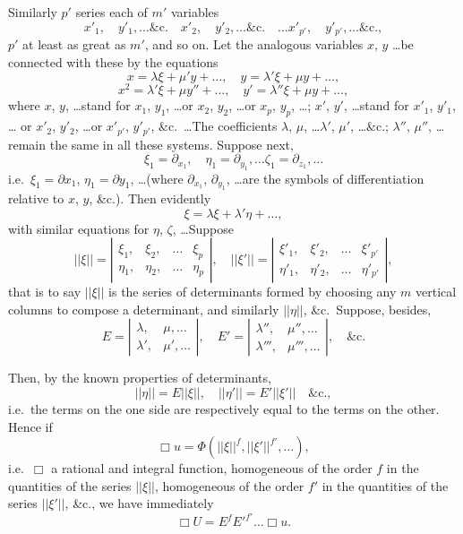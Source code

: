 \documentclass[11pt,a4paper]{article}
\theoremstyle{plain}
\theoremstyle{definition}
\theoremstyle{remark}
\begin{document}
Similarly $p'$ series each of $m'$ variables
\[
x'_1, \quad y'_1, \ldots \&\text{c.} \quad x'_2, \quad y'_2, \ldots \&\text{c.} \quad \ldots x'_{p'}, \quad y'_{p'}, \ldots \&\text{c.},
\]
$p'$ at least as great as $m'$, and so on. Let the analogous variables $x$, $y$ \ldots be connected
with these by the equations
\[
x = \lambda \xi + \mu' y + \ldots, \quad y = \lambda' \xi + \mu y + \ldots,
\]
\[
x^2 = \lambda' \xi + \mu y'' + \ldots, \quad y' = \lambda'' \xi + \mu y + \ldots,
\]
where $x$, $y$, \ldots stand for $x_1$, $y_1$, \ldots or $x_2$, $y_2$, \ldots or $x_p$, $y_p$, \ldots; $x'$, $y'$, \ldots stand for $x'_1$, $y'_1$, \ldots
or $x'_2$, $y'_2$, \ldots or $x'_{p'}$, $y'_{p'}$, \&c.\ \ldots The coefficients $\lambda$, $\mu$, \ldots $\lambda'$, $\mu'$, \ldots \&c.; $\lambda''$, $\mu''$, \ldots
remain the same in all these systems. Suppose next,
\[
\xi_1 = \partial_{x_1}, \quad \eta_1 = \partial_{y_1}, \ldots \zeta_1 = \partial_{z_1}, \ldots
\]
i.e.\ $\xi_1 = \partial x_1$, $\eta_1 = \partial y_1$, \ldots (where $\partial_{x_1}$, $\partial_{y_1}$, \ldots are the symbols of differentiation relative to $x$, $y$, \&c.). Then evidently
\[
\xi = \lambda \xi + \lambda' \eta + \ldots,
\]
with similar equations for $\eta$, $\zeta$, \ldots Suppose
\[
||\xi|| = \left|\begin{array}{cccc}
\xi_1, & \xi_2, & \ldots & \xi_p \\
\eta_1, & \eta_2, & \ldots & \eta_p
\end{array}\right|, \quad
||\xi'|| = \left|\begin{array}{cccc}
\xi'_1, & \xi'_2, & \ldots & \xi'_{p'} \\
\eta'_1, & \eta'_2, & \ldots & \eta'_{p'}
\end{array}\right|,
\]
that is to say $||\xi||$ is the series of determinants formed by choosing any $m$ vertical
columns to compose a determinant, and similarly $||\eta||$, \&c.\ Suppose, besides,
\[
E = \left|\begin{array}{cc}
\lambda, & \mu, \ldots \\
\lambda', & \mu', \ldots
\end{array}\right|, \quad
E' = \left|\begin{array}{cc}
\lambda'', & \mu'', \ldots \\
\lambda''', & \mu''', \ldots
\end{array}\right|, \quad \&\text{c.}
\]

Then, by the known properties of determinants,
\[
||\eta|| = E ||\xi||, \quad ||\eta'|| = E' ||\xi'|| \quad \&\text{c.},
\]
i.e.\ the terms on the one side are respectively equal to the terms on the other. Hence if
\[
\Box u = \Phi(||\xi||^f, ||\xi'||^{f'}, \ldots),
\]
i.e.\ $\Box$ a rational and integral function, homogeneous of the order $f$ in the quantities
of the series $||\xi||$, homogeneous of the order $f'$ in the quantities of the series $||\xi'||$,
\&c., we have immediately
\[
\Box U = E^f E'^{f'} \ldots \Box u.
\]
\end{document}
